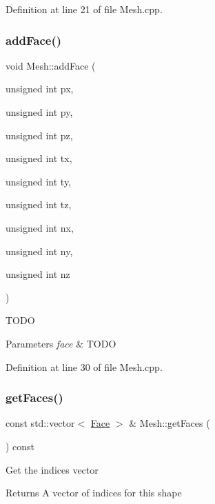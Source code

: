 Definition at line 21 of file Mesh.\+cpp.

\mbox{\label{class_mesh_ac4ec839622d374b31839b143464a2896}} 
\subsubsection{\texorpdfstring{add\+Face()}{addFace()}\hspace{0.1cm}{\footnotesize\ttfamily [2/2]}}
{\footnotesize\ttfamily void Mesh\+::add\+Face (\begin{DoxyParamCaption}\item[{unsigned int}]{px,  }\item[{unsigned int}]{py,  }\item[{unsigned int}]{pz,  }\item[{unsigned int}]{tx,  }\item[{unsigned int}]{ty,  }\item[{unsigned int}]{tz,  }\item[{unsigned int}]{nx,  }\item[{unsigned int}]{ny,  }\item[{unsigned int}]{nz }\end{DoxyParamCaption})}

T\+O\+DO 
\begin{DoxyParams}{Parameters}
{\em face} & T\+O\+DO \\
\hline
\end{DoxyParams}


Definition at line 30 of file Mesh.\+cpp.

\mbox{\label{class_mesh_ad356c83c10098f1d92e7e0ed4c7a32e6}} 
\subsubsection{\texorpdfstring{get\+Faces()}{getFaces()}}
{\footnotesize\ttfamily const std\+::vector$<$ \hyperlink{struct_face}{Face} $>$ \& Mesh\+::get\+Faces (\begin{DoxyParamCaption}{ }\end{DoxyParamCaption}) const}

Get the indices vector \begin{DoxyReturn}{Returns}
A vector of indices for this shape 
\end{DoxyReturn}


